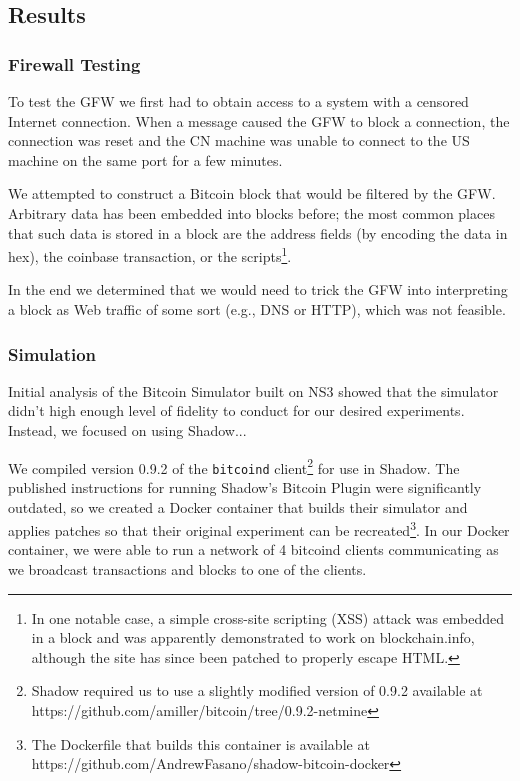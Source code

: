 \subsection{Results}

\subsubsection{Firewall Testing}
To test the GFW we first had to obtain access to a system with a censored Internet connection. When a message caused the GFW to block a connection, the connection was reset and the CN machine was unable to connect to the US machine on the same port for a few minutes.

We attempted to construct a Bitcoin block that would be filtered by the GFW. Arbitrary data has been embedded into blocks before; the most common places that such data is stored in a block are the address fields (by encoding the data in hex), the coinbase transaction, or the scripts\footnote{In one notable case, a simple cross-site scripting (XSS) attack was embedded in a block and was apparently demonstrated to work on blockchain.info\cite{reddit}, although the site has since been patched to properly escape HTML.}. 

In the end we determined that we would need to trick the GFW into interpreting a block as Web traffic of some sort (e.g., DNS or HTTP), which was not feasible.

\subsubsection{Simulation}
Initial analysis of the Bitcoin Simulator built on NS3 showed that the simulator didn't high enough level of fidelity to conduct for our desired experiments. Instead, we focused on using Shadow...

We compiled version 0.9.2 of the \texttt{bitcoind} client\footnote{Shadow required us to use a slightly modified version of 0.9.2 available at https://github.com/amiller/bitcoin/tree/0.9.2-netmine} for use in Shadow. The published instructions for running Shadow's Bitcoin Plugin were significantly outdated, so we created a Docker container that builds their simulator and applies patches so that their original experiment can be recreated\footnote{The Dockerfile that builds this container is available at https://github.com/AndrewFasano/shadow-bitcoin-docker}. In our Docker container, we were able to run a network of 4 bitcoind clients communicating as we broadcast transactions and blocks to one of the clients.

